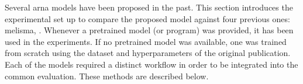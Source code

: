 
Several \gls{arna} models have been proposed in the past.
This section introduces the experimental set up to compare
the proposed model against four previous ones:
\gls{melisma}, \textcite{chen2021attend, micchi2021deep,
mcleod2021modular}. Whenever a pretrained model (or program)
was provided, it has been used in the experiments. If no
pretrained model was available, one was trained from scratch
using the dataset and hyperparameters of the original
publication. Each of the models required a distinct workflow
in order to be integrated into the common evaluation. These
methods are described below. 
